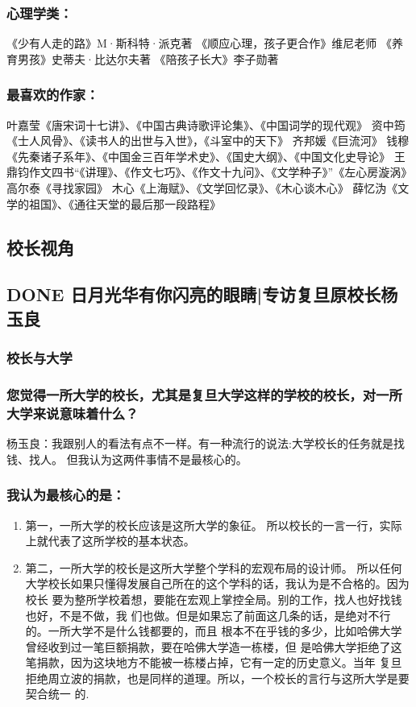 \documentclass[11pt]{ctexart}
\begin{document}
{{{{\subsubsection{心理学类：}
\label{sec:org107a487}
《少有人走的路》M·斯科特·派克著
《顺应心理，孩子更合作》维尼老师
《养育男孩》史蒂夫·比达尔夫著
《陪孩子长大》李子勋著
\subsubsection{最喜欢的作家：}
\label{sec:org03b6f98}
叶嘉莹《唐宋词十七讲》、《中国古典诗歌评论集》、《中国词学的现代观》
资中筠《士人风骨》、《读书人的出世与入世》，《斗室中的天下》
齐邦媛《巨流河》
钱穆《先秦诸子系年》、《中国金三百年学术史》、《国史大纲》、《中国文化史导论》
王鼎钧作文四书“《讲理》、《作文七巧》、《作文十九问》、《文学种子》”《左心房漩涡》
高尔泰《寻找家园》
木心《上海赋》、《文学回忆录》、《木心谈木心》
薛忆沩《文学的祖国》、《通往天堂的最后那一段路程》
\subsection{校长视角}
\label{sec:org74b6bd1}
\subsection{{\bfseries\sffamily DONE} 日月光华有你闪亮的眼睛|专访复旦原校长杨玉良}
\label{sec:org00b5ce9}
\subsubsection{校长与大学}
\label{sec:orge4040fd}
\subsubsection{您觉得一所大学的校长，尤其是复旦大学这样的学校的校长，对一所大学来说意味着什么？}
\label{sec:org861fb0d}


杨玉良：我跟别人的看法有点不一样。有一种流行的说法:大学校长的任务就是找钱、找人。
但我认为这两件事情不是最核心的。
\subsubsection{我认为最核心的是：}
\label{sec:orgeeab3ea}
\begin{enumerate}
\item 第一，一所大学的校长应该是这所大学的象征。
\label{sec:org50f013e}
所以校长的一言一行，实际上就代表了这所学校的基本状态。
\item 第二，一所大学的校长是这所大学整个学科的宏观布局的设计师。
\label{sec:orgdaa7d82}
所以任何大学校长如果只懂得发展自己所在的这个学科的话，我认为是不合格的。因为校长
要为整所学校着想，要能在宏观上掌控全局。别的工作，找人也好找钱也好，不是不做，我
们也做。但是如果忘了前面这几条的话，是绝对不行的。一所大学不是什么钱都要的，而且
根本不在乎钱的多少，比如哈佛大学曾经收到过一笔巨额捐款，要在哈佛大学造一栋楼，但
是哈佛大学拒绝了这笔捐款，因为这块地方不能被一栋楼占掉，它有一定的历史意义。当年
复旦拒绝周立波的捐款，也是同样的道理。所以，一个校长的言行与这所大学是要契合统一
的.
\end{enumerate}



}}}}
\end{document}
